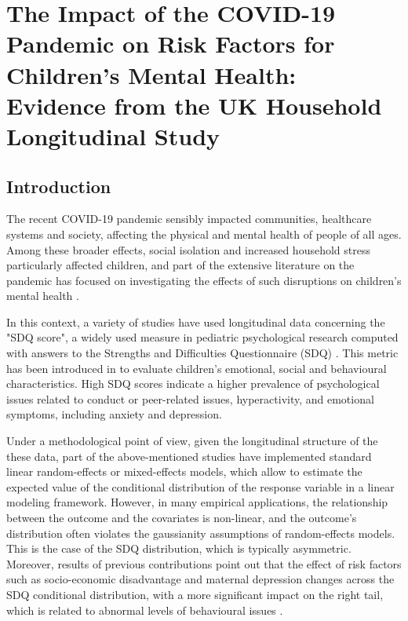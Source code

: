 \chapter{The Impact of the COVID-19 Pandemic on Risk Factors for Children's Mental Health: Evidence from the UK Household Longitudinal Study}\label{ch:SDQ}

\section{Introduction}

The recent COVID-19 pandemic sensibly impacted communities, healthcare systems and society, affecting the physical and mental health of people of all ages. Among these broader effects, social isolation and increased household stress particularly affected children, and part of the extensive literature on the pandemic has focused on investigating the effects of such disruptions on children's mental health \citep{de2020covid, ma2021prevalence, adegboye2021understanding,kauhanen2023systematic}.

\vspace{0.15in}

\noindent In this context, a variety of studies have used longitudinal data concerning the "SDQ score", a widely used measure in pediatric psychological research computed with answers to the Strengths and Difficulties Questionnaire (SDQ) \citep{panagi2024mental, miall2023inequalities, merlo2022quantile, ravens2021quality, bignardi2021longitudinal, waite2021did}. This metric has been introduced in \cite{goodman1997strengths} to evaluate children's emotional, social and behavioural characteristics. High SDQ scores indicate a higher prevalence of psychological issues related to conduct or peer-related issues, hyperactivity, and emotional symptoms, including anxiety and depression.
\vspace{0.15in}

\noindent Under a methodological point of view, given the longitudinal structure of the these data, part of the above-mentioned studies have implemented standard linear random-effects or mixed-effects models, which allow to estimate the expected value of the conditional distribution of the response variable in a linear modeling framework. However, in many empirical applications, the relationship between the outcome and the covariates is non-linear, and the outcome's distribution often violates the gaussianity assumptions of random-effects models. This is the case of the SDQ distribution, which is typically asymmetric. Moreover, results of previous contributions point out that the effect of risk factors such as socio-economic disadvantage and maternal depression changes across the SDQ conditional distribution, with a more significant impact on the right tail, which is related to abnormal levels of behavioural issues \citep{davis2010socioeconomic, flouri2008psychopathology, flouri2010modeling, merlo2022quantile, tzavidis2016longitudinal}.

